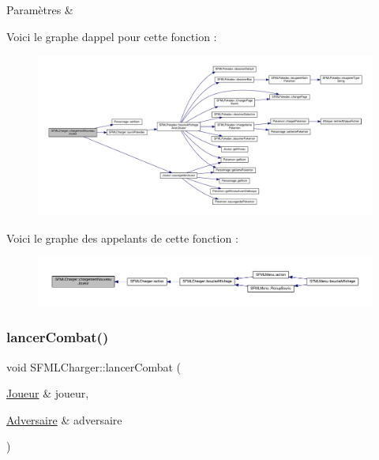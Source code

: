 \begin{DoxyParams}{Paramètres}
{\em } & \\
\hline
\end{DoxyParams}
Voici le graphe d\textquotesingle{}appel pour cette fonction \+:\nopagebreak
\begin{figure}[H]
\begin{center}
\leavevmode
\includegraphics[width=350pt]{class_s_f_m_l_charger_a4c3135a3fa16c88f94cbef9c2ca2c2d8_cgraph}
\end{center}
\end{figure}
Voici le graphe des appelants de cette fonction \+:\nopagebreak
\begin{figure}[H]
\begin{center}
\leavevmode
\includegraphics[width=350pt]{class_s_f_m_l_charger_a4c3135a3fa16c88f94cbef9c2ca2c2d8_icgraph}
\end{center}
\end{figure}
\mbox{\label{class_s_f_m_l_charger_a988a052585ee0fe9e61535d5027a6f81}} 
\subsubsection{\texorpdfstring{lancer\+Combat()}{lancerCombat()}}
{\footnotesize\ttfamily void S\+F\+M\+L\+Charger\+::lancer\+Combat (\begin{DoxyParamCaption}\item[{\hyperlink{class_joueur}{Joueur} \&}]{joueur,  }\item[{\hyperlink{class_adversaire}{Adversaire} \&}]{adversaire }\end{DoxyParamCaption})\hspace{0.3cm}{\ttfamily [private]}}



